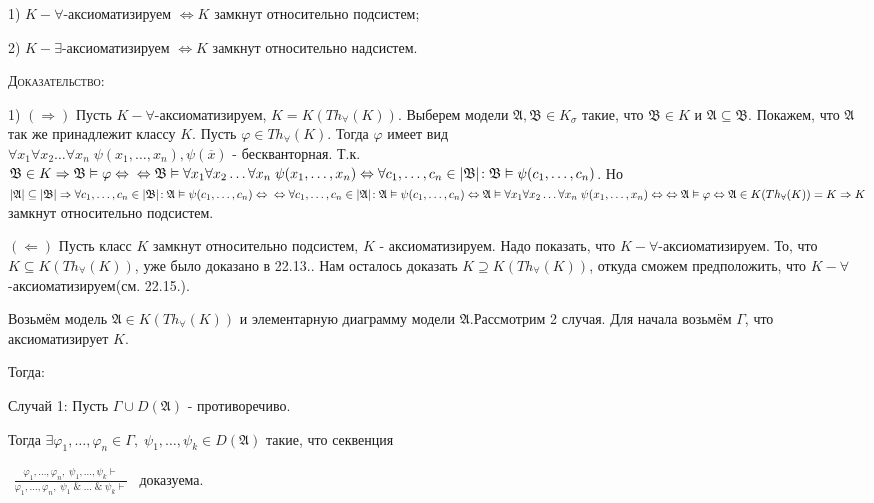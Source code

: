 \documentclass[18pt, a4paper]{extarticle}
\newcommand{\ampersand}{\;\&\;}
\newcommand{\Gm}{\Gamma}
\newcommand{\vp}{\varphi}
\newcommand{\vd}{\vdash}
\newcommand{\vD}{\vDash}
\newcommand{\sg}{\sigma}
\newcommand{\ovl}[1]{\overline{#1}}
\newcommand{\rightdok}{\boxed{(\Rightarrow)}}
\newcommand{\leftdok}{\boxed{(\Leftarrow)}}
\newcommand{\mA}{\mathfrak{A}}
\newcommand{\mB}{\mathfrak{B}}
\newcommand{\dok}{\textsc{Доказательство:}}
\begin{document}
1) $K-\forall$-аксиоматизируем $\Leftrightarrow K$ замкнут относительно подсистем;

2) $K-\exists$-аксиоматизируем $\Leftrightarrow K$ замкнут относительно надсистем.

\dok 

1) $\rightdok$ Пусть $K-\forall$-аксиоматизируем, $K=K(Th_\forall(K))$. Выберем модели $\mA,\mB\in K_\sg$ такие, что $\mB\in K$ и $\mA\subseteq\mB$. Покажем, что $\mA$ так же принадлежит классу $K$. Пусть $\vp\in Th_\forall(K)$. Тогда $\vp$ имеет вид\\ $\forall x_1\forall x_2\dots\forall x_n\;\psi(x_1,\dots,x_n), \psi(\ovl x)$ - бескванторная. Т.к. $\mB\in K\Rightarrow\mB\vD\vp\Leftrightarrow\newline\Leftrightarrow\mB\vD\forall x_1\forall x_2\dots\forall x_n\;\psi(x_1,\dots,x_n)\Leftrightarrow\forall c_1,\dots,c_n\in|\mB|\!:\mB\vD\psi(c_1,\dots,c_n)$. Но $|\mA|\subseteq|\mB|\Rightarrow\forall c_1,\dots,c_n\in|\mB|\!:\mA\vD\psi(c_1,\dots,c_n)\Leftrightarrow\newline\Leftrightarrow\forall c_1,\dots,c_n\in|\mA|\!:\mA\vD\psi(c_1,\dots,c_n)\Leftrightarrow\mA\vD\forall x_1\forall x_2\dots\forall x_n\;\psi(x_1,\dots,x_n)\Leftrightarrow\;\Leftrightarrow\mA\vD\vp\Leftrightarrow\mA\in K(Th_\forall(K))=K\Rightarrow K$ замкнут относительно подсистем.

$\leftdok$ Пусть класс $K$ замкнут относительно подсистем, $K$ - аксиоматизируем. Надо показать, что $K-\forall$-аксиоматизируем. То, что $K\subseteq K(Th_\forall(K))$, уже было доказано в 22.13.. Нам осталось доказать $K\supseteq K(Th_\forall(K))$, откуда сможем предположить, что $K-\forall$-аксиоматизируем(см. 22.15.). 

Возьмём модель $\mA\in K(Th_\forall(K))$ и элементарную диаграмму модели $\mA$.\newline Рассмотрим 2 случая. Для начала возьмём $\Gm$, что аксиоматизирует $K$. 

Тогда:

\qquad Случай 1: Пусть $\Gm\cup D(\mA)$ - противоречиво. 

Тогда $\exists\vp_1,\dots,\vp_n\in\Gm,\;\psi_1,\dots,\psi_k\in D(\mA)$ такие, что секвенция 

\vspace{0.57cm}
$\begin{matrix}\displaystyle\frac{\vp_1,\dots,\vp_n,\;\psi_1,\dots,\psi_k\vd}{\vp_1,\dots,\vp_n,\;\psi_1\ampersand\dots\ampersand\psi_k\vd} & \text{доказуема.}\end{matrix}$ \\
\end{document}
